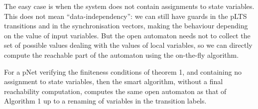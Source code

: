 \documentclass[smallcondensed]{svjour3}
\newcommand{\ERIC}[1]{\textcolor{blue}{#1}}
\begin{document}
The easy case is when the system does not contain assignments to state
variables. This does not mean ``data-independency'': we can still have
guards in the pLTS transitions and in the synchronisation vectors,
making the behaviour depending on the value of input variables. But
the open automaton needs not to collect the set of possible values dealing
with the values of local variables, so we can directly compute the
reachable part of the automaton using the on-the-fly algorithm.

\begin{theorem}
  \label{Th:CorrectnessWithoutAssignments}
For a pNet verifying the finiteness conditions of theorem 1, and
containing no assignment to state variables, then the smart  
algorithm, without a final reachability computation, computes 
the same open automaton as that of Algorithm 1 up to a renaming of
variables in the transition labels.  
  \end{theorem}

\end{document}

